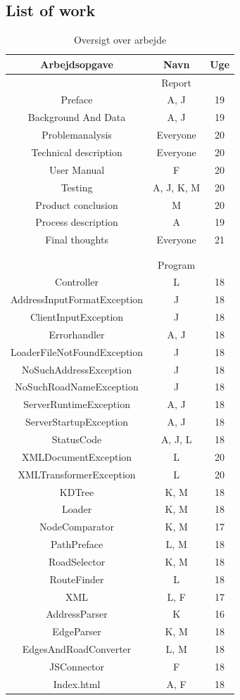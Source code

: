 \documentclass[a4paper,10pt,titlepage]{article}
\begin{document}
	\subsection{List of work}
	\begin{table}[H]
\caption{Oversigt over arbejde}
\centering
\begin{tabular}{c c c}
Arbejdsopgave & Navn & Uge \\ [1.5ex] 
\hline
   & Report &  \\
Preface & A, J & 19 \\
Background And Data & A, J & 19 \\
Problemanalysis & Everyone & 20\\
Technical description & Everyone & 20 \\
User Manual & F & 20 \\
Testing & A, J, K, M  & 20 \\
Product conclusion & M & 20\\
Process description & A & 19\\
Final thoughts & Everyone & 21\\
\\
\\
  & Program &  \\
Controller & L & 18 \\
AddressInputFormatException & J & 18 \\
ClientInputException & J & 18 \\
Errorhandler & A, J & 18 \\
LoaderFileNotFoundException & J & 18 \\
NoSuchAddressException & J & 18 \\
NoSuchRoadNameException & J & 18 \\
ServerRuntimeException & A, J & 18 \\
ServerStartupException & A, J & 18 \\
StatusCode & A, J, L & 18 \\
XMLDocumentException & L & 20 \\
XMLTransformerException & L & 20 \\
KDTree & K, M & 18 \\
Loader & K, M & 18 \\
NodeComparator & K, M & 17 \\
PathPreface & L, M & 18 \\
RoadSelector & K, M & 18 \\
RouteFinder & L & 18 \\
XML	& L, F & 17 \\
AddressParser & K & 16 \\
EdgeParser & K, M & 18 \\
EdgesAndRoadConverter & L, M & 18 \\
JSConnector & F & 18 \\
Index.html & A, F & 18 \\

\end{tabular}
\end{table}
\end{document}
